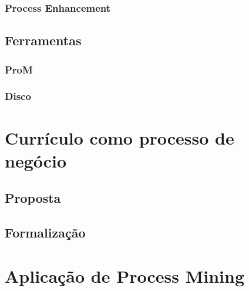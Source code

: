 \documentclass[a4paper]{article}
\begin{document}
\lipsum[10]
\lipsum[10]
\lipsum[10]
\lipsum[10]
\lipsum[10]
\lipsum[10]

\subsubsection{Process Enhancement}

\lipsum[10]
\lipsum[10]
\lipsum[10]
\lipsum[10]
\lipsum[10]
\lipsum[10]

\subsection{Ferramentas}

\lipsum[10]
\lipsum[10]
\lipsum[10]
\lipsum[10]
\lipsum[10]

\subsubsection{ProM}

\cite{ProM}
\lipsum[10]
\lipsum[10]
\lipsum[10]
\lipsum[10]
\lipsum[10]

\subsubsection{Disco}

\cite{Disco}
\lipsum[10]
\lipsum[10]
\lipsum[10]
\lipsum[10]
\lipsum[10]

\section{Currículo como processo de negócio}

\lipsum[10]
\lipsum[10]
\lipsum[10]

\subsection{Proposta}

\lipsum[10]
\lipsum[10]
\lipsum[10]
\lipsum[10]
\lipsum[10]

\subsection{Formalização}

\lipsum[10]
\lipsum[10]
\lipsum[10]
\lipsum[10]
\lipsum[10]

\section{Aplicação de Process Mining}
\end{document}
